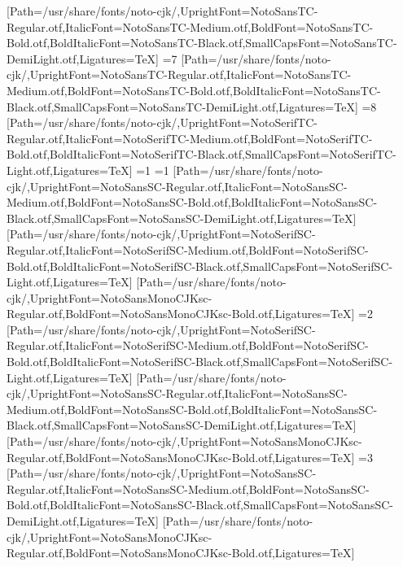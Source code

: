 [Path=/usr/share/fonts/noto-cjk/,UprightFont=NotoSansTC-Regular.otf,ItalicFont=NotoSansTC-Medium.otf,BoldFont=NotoSansTC-Bold.otf,BoldItalicFont=NotoSansTC-Black.otf,SmallCapsFont=NotoSansTC-DemiLight.otf,Ligatures=TeX]
\else\ifnum\value{CJKFonts}=7
[Path=/usr/share/fonts/noto-cjk/,UprightFont=NotoSansTC-Regular.otf,ItalicFont=NotoSansTC-Medium.otf,BoldFont=NotoSansTC-Bold.otf,BoldItalicFont=NotoSansTC-Black.otf,SmallCapsFont=NotoSansTC-DemiLight.otf,Ligatures=TeX]
\else\ifnum\value{CJKFonts}=8
[Path=/usr/share/fonts/noto-cjk/,UprightFont=NotoSerifTC-Regular.otf,ItalicFont=NotoSerifTC-Medium.otf,BoldFont=NotoSerifTC-Bold.otf,BoldItalicFont=NotoSerifTC-Black.otf,SmallCapsFont=NotoSerifTC-Light.otf,Ligatures=TeX]
\fi\fi\fi\fi\fi\fi\fi\fi\else
\ifnum\value{CJKLanguage}=1
\ifnum\value{CJKFonts}=1
[Path=/usr/share/fonts/noto-cjk/,UprightFont=NotoSansSC-Regular.otf,ItalicFont=NotoSansSC-Medium.otf,BoldFont=NotoSansSC-Bold.otf,BoldItalicFont=NotoSansSC-Black.otf,SmallCapsFont=NotoSansSC-DemiLight.otf,Ligatures=TeX]
[Path=/usr/share/fonts/noto-cjk/,UprightFont=NotoSerifSC-Regular.otf,ItalicFont=NotoSerifSC-Medium.otf,BoldFont=NotoSerifSC-Bold.otf,BoldItalicFont=NotoSerifSC-Black.otf,SmallCapsFont=NotoSerifSC-Light.otf,Ligatures=TeX]
[Path=/usr/share/fonts/noto-cjk/,UprightFont=NotoSansMonoCJKsc-Regular.otf,BoldFont=NotoSansMonoCJKsc-Bold.otf,Ligatures=TeX]
\else\ifnum\value{CJKFonts}=2
[Path=/usr/share/fonts/noto-cjk/,UprightFont=NotoSerifSC-Regular.otf,ItalicFont=NotoSerifSC-Medium.otf,BoldFont=NotoSerifSC-Bold.otf,BoldItalicFont=NotoSerifSC-Black.otf,SmallCapsFont=NotoSerifSC-Light.otf,Ligatures=TeX]
[Path=/usr/share/fonts/noto-cjk/,UprightFont=NotoSansSC-Regular.otf,ItalicFont=NotoSansSC-Medium.otf,BoldFont=NotoSansSC-Bold.otf,BoldItalicFont=NotoSansSC-Black.otf,SmallCapsFont=NotoSansSC-DemiLight.otf,Ligatures=TeX]
[Path=/usr/share/fonts/noto-cjk/,UprightFont=NotoSansMonoCJKsc-Regular.otf,BoldFont=NotoSansMonoCJKsc-Bold.otf,Ligatures=TeX]
\else\ifnum\value{CJKFonts}=3
[Path=/usr/share/fonts/noto-cjk/,UprightFont=NotoSansSC-Regular.otf,ItalicFont=NotoSansSC-Medium.otf,BoldFont=NotoSansSC-Bold.otf,BoldItalicFont=NotoSansSC-Black.otf,SmallCapsFont=NotoSansSC-DemiLight.otf,Ligatures=TeX]
[Path=/usr/share/fonts/noto-cjk/,UprightFont=NotoSansMonoCJKsc-Regular.otf,BoldFont=NotoSansMonoCJKsc-Bold.otf,Ligatures=TeX]
